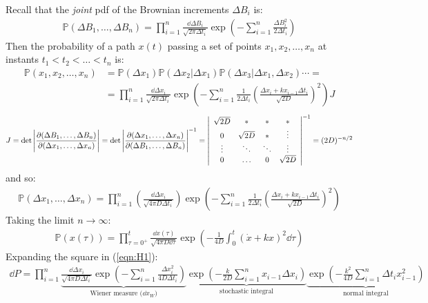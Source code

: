 \documentclass[../template.tex]{subfiles}
\begin{document}
Recall that the \textit{joint} pdf of the Brownian increments $\Delta B_i$ is:
\begin{align*}
    \mathbb{P}(\Delta B_1, \dots, \Delta B_n) = \prod_{i=1}^n \frac{\dd{\Delta B_i}}{\sqrt{2 \pi \Delta t_i}} \exp\left(-\sum_{i=1}^n \frac{\Delta B_i^2}{ 2 \Delta t_i} \right) 
\end{align*} 
Then the probability of a path $x(t)$ passing  a set of points $x_1, x_2, \dots, x_n$ at instants $t_1 < t_2 < \dots < t_n$ is:
\begin{align*}
    \mathbb{P}(x_1, x_2, \dots, x_n) &= \mathbb{P}(\Delta x_1) \mathbb{P}(\Delta x_2 | \Delta x_1) \mathbb{P}(\Delta x_3 | \Delta x_1, \Delta x_2) \cdots =\\
    &= \prod_{i=1}^n \frac{\dd{\Delta x_i}}{\sqrt{2 \pi \Delta t_i}} \exp\left(-\sum_{i=1}^n \frac{1}{2 \Delta t_i} \left(\frac{\Delta x_i + k x_{i-1} \Delta t_i}{\sqrt{2 D}} \right)^2 \right) J
\end{align*}
\begin{align*}
    J = \operatorname{det}\Bigg| \pdv{(\Delta B_1, \dots, \Delta B_n)}{(\Delta x_1, \dots, \Delta x_n)}\Bigg| = \operatorname{det} \Bigg|\pdv{(\Delta x_1, \dots, \Delta x_n)}{(\Delta B_1, \dots, \Delta B_n)}\Bigg|^{-1} = \left|\begin{array}{cccc}
    \sqrt{2D} & * & * & * \\ 
    0 & \sqrt{2D} & * & \vdots \\ 
    \vdots & \ddots & \ddots & \vdots \\ 
    0 & \dots & 0 & \sqrt{2D}
    \end{array}\right|^{-1} = (2 D)^{-n/2}
\end{align*}
and so:
\begin{align} \label{eqn:H1}
    \mathbb{P}(\Delta x_1, \dots, \Delta x_n) = \prod_{i=1}^n \left(\frac{\dd{\Delta x_i}}{\sqrt{4 \pi D \Delta t_i}}\right) \exp\left(-\sum_{i=1}^n \frac{1}{2 \Delta t_i} \left(\frac{\Delta x_i + k x_{i-1} \Delta t_i}{\sqrt{2D}} \right)^2 \right) 
\end{align}
Taking the limit $n \to \infty$:
\begin{align*}
    \mathbb{P}(x(\tau)) = \prod_{\tau = 0^+}^t \frac{\dd{x(\tau)}}{\sqrt{4 \pi D \dd{\tau}}} \exp\left(-\frac{1}{4 D} \int_0^t (\dot{x} + k x)^2 \dd{\tau} \right) 
\end{align*}
Expanding the square in (\ref{eqn:H1}):
\begin{align}
    \dd{P} = \prod_{i=1}^n \underbrace{\frac{\dd{\Delta x_i}}{\sqrt{4 \pi D \Delta t_i}} \exp\left(-\sum_{i=1}^n \frac{\Delta x_i^2}{4 D \Delta t_i} \right) }_{\text{Wiener measure ($\dd{x_W}$)}} \underbrace{\exp\left(-\frac{k}{2D} \sum_{i=1}^n x_{i-1} \Delta x_i\right)}_{\text{stochastic integral}} \underbrace{\exp\left(-\frac{k^2}{4D} \sum_{i=1}^n \Delta t_i x_{i-1}^2 \right)}_{\text{normal integral}}   
    \label{eqn:dP}
\end{align}
\end{document}
